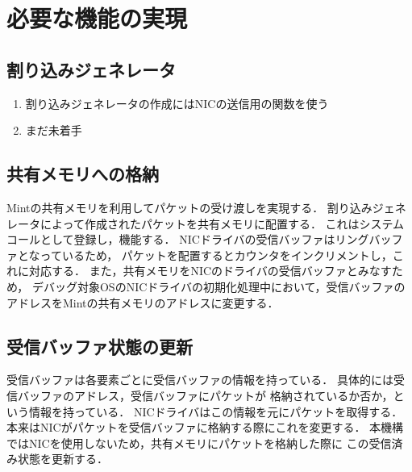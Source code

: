 \documentclass[tanilab-enum]{graduate}
\begin{document}
\section{必要な機能の実現}
\subsection{割り込みジェネレータ}
\begin{enumerate}
    \item 割り込みジェネレータの作成にはNICの送信用の関数を使う
    \item まだ未着手
\end{enumerate}
\subsection{共有メモリへの格納}
Mintの共有メモリを利用してパケットの受け渡しを実現する．
割り込みジェネレータによって作成されたパケットを共有メモリに配置する．
これはシステムコールとして登録し，機能する．
NICドライバの受信バッファはリングバッファとなっているため，
パケットを配置するとカウンタをインクリメントし，これに対応する．
また，共有メモリをNICのドライバの受信バッファとみなすため，
デバッグ対象OSのNICドライバの初期化処理中において，受信バッファの
アドレスをMintの共有メモリのアドレスに変更する．
\subsection{受信バッファ状態の更新}
受信バッファは各要素ごとに受信バッファの情報を持っている．
具体的には受信バッファのアドレス，受信バッファにパケットが
格納されているか否か，という情報を持っている．
NICドライバはこの情報を元にパケットを取得する．
本来はNICがパケットを受信バッファに格納する際にこれを変更する．
本機構ではNICを使用しないため，共有メモリにパケットを格納した際に
この受信済み状態を更新する．
\end{document}
